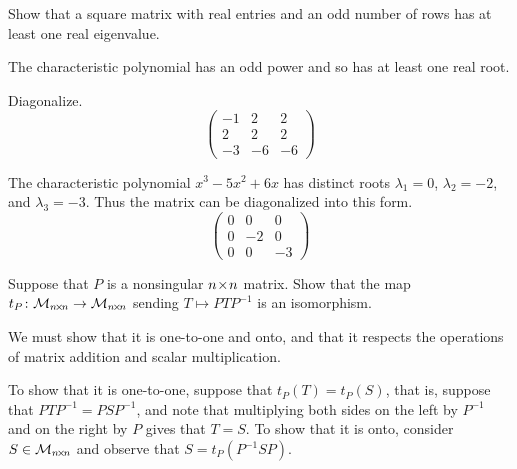 \begin{exercises}
\begin{answer}
    \end{answer}
  \item 
    Show that a square matrix with real entries and an odd number of rows
    has at least one real eigenvalue.
    \begin{answer}
      The characteristic polynomial has an odd power and so 
      has at least one real root.  
    \end{answer}
  \item 
    Diagonalize.
    \begin{equation*}
       \begin{pmatrix}
         -1  &2  &2  \\
          2  &2  &2  \\
         -3  &-6 &-6
       \end{pmatrix}
    \end{equation*}
    \begin{answer}
      The characteristic polynomial $x^3-5x^2+6x$ has distinct roots
      \( \lambda_1=0 \), \( \lambda_2=-2 \), and \( \lambda_3=-3 \).
      Thus the matrix can be diagonalized into this form.
      \begin{equation*}
         \begin{pmatrix}
            0  &0  &0  \\
            0  &-2 &0  \\
            0  &0  &-3
         \end{pmatrix}
      \end{equation*}    
    \end{answer}
  \item 
    Suppose that \( P \) is a nonsingular \( n \! \times \! n \) matrix.
    Show that 
    the 
    map \( \mbox{$t_P\colon \mathcal{M}_{n \! \times \! n}\to \mathcal{M}_{n \! \times \! n}$} \)
    sending \( T\mapsto PTP^{-1} \)
    is an isomorphism.
    \begin{answer}
      We must show that it is one-to-one and onto, and that it respects the
      operations of matrix addition and scalar multiplication.

      To show that it is one-to-one, suppose that $t_P(T)=t_P(S)$,
      that is, suppose that $PTP^{-1}=PSP^{-1}$, and note that multiplying
      both sides on the left by $P^{-1}$ and on the right by $P$ gives that
      $T=S$.
      To show that it is onto, consider $S\in\mathcal{M}_{n \! \times \! n}$ and observe
      that $S=t_P(P^{-1}SP)$.


\end{answer}
\end{exercises}
